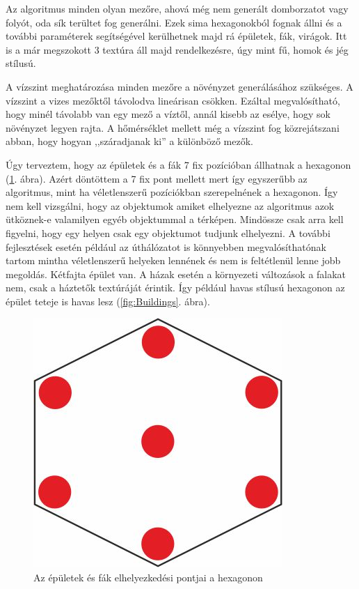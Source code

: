 
Az algoritmus minden olyan mezőre, ahová még nem generált domborzatot vagy folyót, oda sík terültet fog generálni. Ezek sima hexagonokból fognak állni és a további paraméterek segítségével kerülhetnek majd rá épületek, fák, virágok. Itt is a már megszokott 3 textúra áll majd rendelkezésre, úgy mint fű, homok és jég stílusú.


A vízszint meghatározása minden mezőre a növényzet generálásához szükséges. A vízszint a vizes mezőktől távolodva lineárisan csökken. Ezáltal megvalósítható, hogy minél távolabb van egy mező a víztől, annál kisebb az esélye, hogy sok növényzet legyen rajta. A hőmérséklet mellett még a vízszint fog közrejátszani abban, hogy hogyan ,,száradjanak ki'' a különböző mezők.


Úgy terveztem, hogy az épületek és a fák 7 fix pozícióban állhatnak a hexagonon (\ref{fig:Places}. ábra). Azért döntöttem a 7 fix pont mellett mert így egyszerűbb az algoritmus, mint ha véletlenszerű pozíciókban szerepelnének a hexagonon. Így nem kell vizsgálni, hogy az objektumok amiket elhelyezne az algoritmus azok ütköznek-e valamilyen egyéb objektummal a térképen. Mindössze csak arra kell figyelni, hogy egy helyen csak egy objektumot tudjunk elhelyezni. A további fejlesztések esetén például az úthálózatot is könnyebben megvalósíthatónak tartom mintha véletlenszerű helyeken lennének és nem is feltétlenül lenne jobb megoldás. Kétfajta épület van. A házak esetén a környezeti változások a falakat nem, csak a háztetők textúráját érintik. Így például havas stílusú hexagonon az épület teteje is havas lesz (\ref{fig:Buildings}. ábra).

\begin{figure}[h!]
\centering
\includegraphics[scale=1]{kepek/Places.jpg}
\caption{Az épületek és fák elhelyezkedési pontjai a hexagonon}
\label{fig:Places}
\end{figure}

